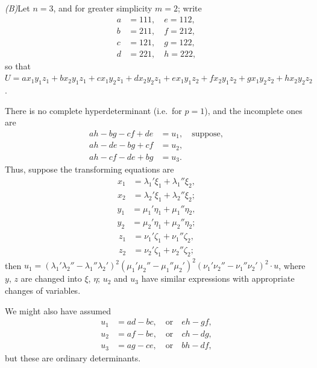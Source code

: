 \documentclass[11pt,a4paper]{article}
\theoremstyle{plain}
\theoremstyle{definition}
\theoremstyle{remark}
\begin{document}
\newpage
\textit{(B)}\quad Let $n=3$, and for greater simplicity $m=2$; write
\begin{align*}
a &= 111, \quad e = 112, \\
b &= 211, \quad f = 212, \\
c &= 121, \quad g = 122, \\
d &= 221, \quad h = 222,
\end{align*}
so that $U = ax_1y_1z_1 + bx_2y_1z_1 + cx_1y_2z_1 + dx_2y_2z_1 + ex_1y_1z_2 + fx_2y_1z_2 + gx_1y_2z_2 + hx_2y_2z_2$.

There is no complete hyperdeterminant (i.e.\ for $p=1$), and the incomplete ones are
\begin{align*}
ah - bg - cf + de &= u_1, \quad \text{suppose}, \\
ah - de - bg + cf &= u_2, \\
ah - cf - de + bg &= u_3.
\end{align*}
Thus, suppose the transforming equations are
\begin{align*}
x_1 &= \lambda_1' \xi_1 + \lambda_1'' \xi_2, \\
x_2 &= \lambda_2' \xi_1 + \lambda_2'' \xi_2;
\end{align*}
\begin{align*}
y_1 &= \mu_1' \eta_1 + \mu_1'' \eta_2, \\
y_2 &= \mu_2' \eta_1 + \mu_2'' \eta_2;
\end{align*}
\begin{align*}
z_1 &= \nu_1' \zeta_1 + \nu_1'' \zeta_2, \\
z_2 &= \nu_2' \zeta_1 + \nu_2'' \zeta_2;
\end{align*}
then $u_1 = (\lambda_1'\lambda_2'' - \lambda_1''\lambda_2')^2 (\mu_1'\mu_2'' - \mu_1''\mu_2')^2 (\nu_1'\nu_2'' - \nu_1''\nu_2')^2 \cdot u$, where $y$, $z$ are changed
into $\xi$, $\eta$; $u_2$ and $u_3$ have similar expressions with appropriate changes of variables.

We might also have assumed
\begin{align*}
u_1 &= ad - bc, \quad \text{or} \quad eh - gf, \\
u_2 &= af - be, \quad \text{or} \quad ch - dg, \\
u_3 &= ag - ce, \quad \text{or} \quad bh - df,
\end{align*}
but these are ordinary determinants.
\end{document}
